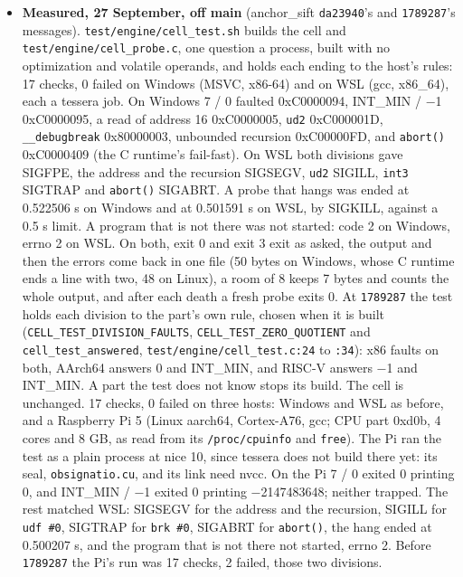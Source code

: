 \begin{enumerate}
\begin{itemize}
\begin{enumerate}
\begin{itemize}
\item \textbf{Measured, 27 September, off main} (anchor\_\allowbreak{}sift \texttt{da23940}'s and \texttt{1789287}'s messages). \texttt{test/\allowbreak{}engine/\allowbreak{}cell\_\allowbreak{}test.\allowbreak{}sh} builds the cell and \texttt{test/\allowbreak{}engine/\allowbreak{}cell\_\allowbreak{}probe.\allowbreak{}c}, one question a process, built with no optimization and volatile operands, and holds each ending to the host's rules: 17 checks, 0 failed on Windows (MSVC, x86-64) and on WSL (gcc, x86\_\allowbreak{}64), each a tessera job. On Windows 7 / 0 faulted 0xC0000094, INT\_\allowbreak{}MIN / −1 0xC0000095, a read of address 16 0xC0000005, \texttt{ud2} 0xC000001D, \texttt{\_\allowbreak{}\_\allowbreak{}debugbreak} 0x80000003, unbounded recursion 0xC00000FD, and \texttt{abort()} 0xC0000409 (the C runtime's fail-fast). On WSL both divisions gave SIGFPE, the address and the recursion SIGSEGV, \texttt{ud2} SIGILL, \texttt{int3} SIGTRAP and \texttt{abort()} SIGABRT. A probe that hangs was ended at 0.522506 s on Windows and at 0.501591 s on WSL, by SIGKILL, against a 0.5 s limit. A program that is not there was not started: code 2 on Windows, errno 2 on WSL. On both, exit 0 and exit 3 exit as asked, the output and then the errors come back in one file (50 bytes on Windows, whose C runtime ends a line with two, 48 on Linux), a room of 8 keeps 7 bytes and counts the whole output, and after each death a fresh probe exits 0. At \texttt{1789287} the test holds each division to the part's own rule, chosen when it is built (\texttt{CELL\_\allowbreak{}TEST\_\allowbreak{}DIVISION\_\allowbreak{}FAULTS}, \texttt{CELL\_\allowbreak{}TEST\_\allowbreak{}ZERO\_\allowbreak{}QUOTIENT} and \texttt{cell\_\allowbreak{}test\_\allowbreak{}answered}, \texttt{test/\allowbreak{}engine/\allowbreak{}cell\_\allowbreak{}test.\allowbreak{}c:24} to \texttt{:34}): x86 faults on both, AArch64 answers 0 and INT\_\allowbreak{}MIN, and RISC-V answers −1 and INT\_\allowbreak{}MIN. A part the test does not know stops its build. The cell is unchanged. 17 checks, 0 failed on three hosts: Windows and WSL as before, and a Raspberry Pi 5 (Linux aarch64, Cortex-A76, gcc; CPU part 0xd0b, 4 cores and 8 GB, as read from its \texttt{/\allowbreak{}proc/\allowbreak{}cpuinfo} and \texttt{free}). The Pi ran the test as a plain process at nice 10, since tessera does not build there yet: its seal, \texttt{obsignatio.\allowbreak{}cu}, and its link need nvcc. On the Pi 7 / 0 exited 0 printing 0, and INT\_\allowbreak{}MIN / −1 exited 0 printing −2147483648; neither trapped. The rest matched WSL: SIGSEGV for the address and the recursion, SIGILL for \texttt{udf \#0}, SIGTRAP for \texttt{brk \#0}, SIGABRT for \texttt{abort()}, the hang ended at 0.500207 s, and the program that is not there not started, errno 2. Before \texttt{1789287} the Pi's run was 17 checks, 2 failed, those two divisions.

\end{itemize}
\end{enumerate}
\end{itemize}
\end{enumerate}
